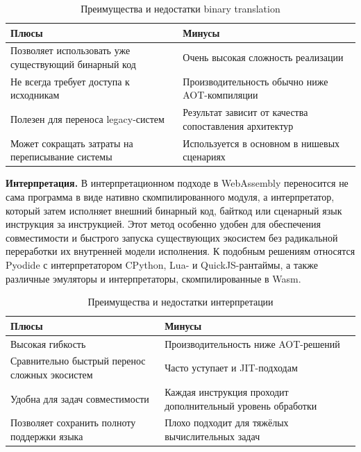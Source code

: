 \documentclass[12pt, oneside]{book}
\begin{document}
\begin{table}[htbp]
\centering
\scriptsize
\renewcommand{\arraystretch}{1.15}
\begin{tabular}{|p{5.8cm}|p{5.8cm}|}
\hline
\textbf{Плюсы} & \textbf{Минусы} \\
\hline
Позволяет использовать уже существующий бинарный код & Очень высокая сложность реализации \\
\hline
Не всегда требует доступа к исходникам & Производительность обычно ниже AOT-компиляции \\
\hline
Полезен для переноса legacy-систем & Результат зависит от качества сопоставления архитектур \\
\hline
Может сокращать затраты на переписывание системы & Используется в основном в нишевых сценариях \\
\hline
\end{tabular}
\caption{Преимущества и недостатки binary translation}
\label{tab:binary_translation_pros_cons}
\end{table}

    \quad \textbf{Интерпретация.} В интерпретационном подходе в WebAssembly переносится не сама программа в виде нативно скомпилированного модуля, а интерпретатор, который затем исполняет внешний бинарный код, байткод или сценарный язык инструкция за инструкцией. Этот метод особенно удобен для обеспечения совместимости и быстрого запуска существующих экосистем без радикальной переработки их внутренней модели исполнения. К подобным решениям относятся Pyodide с интерпретатором CPython, Lua- и QuickJS-рантаймы, а также различные эмуляторы и интерпретаторы, скомпилированные в Wasm.

\begin{table}[htbp]
\centering
\scriptsize
\renewcommand{\arraystretch}{1.15}
\begin{tabular}{|p{5.8cm}|p{5.8cm}|}
\hline
\textbf{Плюсы} & \textbf{Минусы} \\
\hline
Высокая гибкость & Производительность ниже AOT-решений \\
\hline
Сравнительно быстрый перенос сложных экосистем & Часто уступает и JIT-подходам \\
\hline
Удобна для задач совместимости & Каждая инструкция проходит дополнительный уровень обработки \\
\hline
Позволяет сохранить полноту поддержки языка & Плохо подходит для тяжёлых вычислительных задач \\
\hline
\end{tabular}
\caption{Преимущества и недостатки интерпретации}
\label{tab:interpretation_pros_cons}
\end{table}
\end{document}
